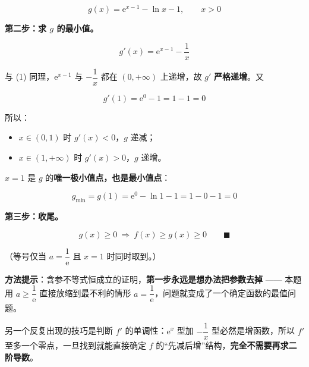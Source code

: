 \begin{answer}
\nopagebreak[4]
\[g(x)=\mathrm e^{x-1}-\ln x-1,\qquad x>0\]

\textbf{第二步：求 $g$ 的最小值。}

\nopagebreak[4]
\[g'(x)=\mathrm e^{x-1}-\frac1x\]

与 (1) 同理，$\mathrm e^{x-1}$ 与 $-\dfrac1x$ 都在 $(0,+\infty)$ 上递增，故 $g'$ \textbf{严格递增}。又

\nopagebreak[4]
\[g'(1)=\mathrm e^{0}-1=1-1=0\]

所以：

\begin{itemize}
\item $x\in(0,1)$ 时 $g'(x)<0$，$g$ 递减；
\item $x\in(1,+\infty)$ 时 $g'(x)>0$，$g$ 递增。
\end{itemize}

$x=1$ 是 $g$ 的\textbf{唯一极小值点，也是最小值点}：

\nopagebreak[4]
\[g_{\min}=g(1)=\mathrm e^{0}-\ln1-1=1-0-1=0\]

\textbf{第三步：收尾。}

\nopagebreak[4]
\[g(x)\ge0\ \Longrightarrow\ f(x)\ge g(x)\ge0\qquad\blacksquare\]

（等号仅当 $a=\dfrac1{\mathrm e}$ 且 $x=1$ 时同时取到。）

\begin{gktip}
\textbf{方法提示}：含参不等式恒成立的证明，\textbf{第一步永远是想办法把参数去掉} —— 本题用 $a\ge\dfrac1{\mathrm e}$ 直接放缩到最不利的情形 $a=\dfrac1{\mathrm e}$，问题就变成了一个确定函数的最值问题。

另一个反复出现的技巧是判断 $f'$ 的单调性：$\mathrm e^{x}$ 型加 $-\dfrac1x$ 型必然是增函数，所以 $f'$ 至多一个零点，一旦找到就能直接确定 $f$ 的“先减后增”结构，\textbf{完全不需要再求二阶导数}。
\end{gktip}

\par\medskip

\Needspace{0.4\textheight}



\par\medskip

\end{answer}

